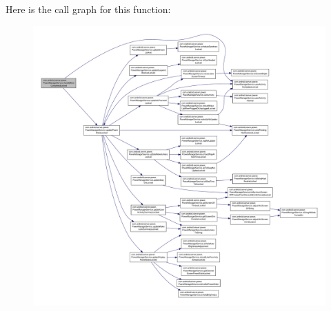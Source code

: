 Here is the call graph for this function\-:
\nopagebreak
\begin{figure}[H]
\begin{center}
\leavevmode
\includegraphics[width=350pt]{classcom_1_1android_1_1server_1_1power_1_1PowerManagerService_a5ac6cc2d1dfb46da8cc1edf989f2870a_cgraph}
\end{center}
\end{figure}


